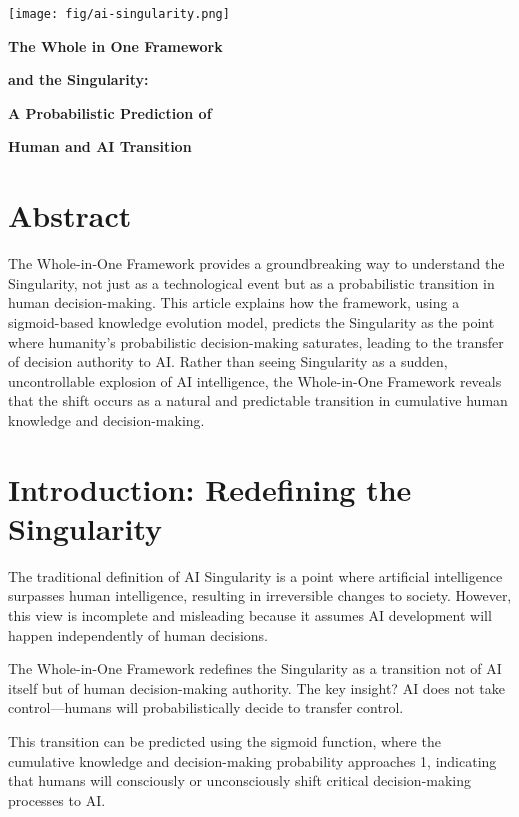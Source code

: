 \documentclass[a4]{article}
\newcommand{\bn}{\bigskip\noindent}
\newcommand{\mn}{\medskip\noindent}
\begin{document}
\begin{center}
\texttt{[image: fig/ai-singularity.png]}
\end{center}

\mn
{\huge\bf The Whole in One Framework}  

\bn
{\huge\bf  and the Singularity: }

\bn
{\huge\bf A Probabilistic Prediction of }

\bn
{\huge\bf Human and AI Transition}

\bn
\section*{Abstract}

The Whole-in-One Framework provides a groundbreaking way to understand the Singularity, not just as a technological event but as a probabilistic transition in human decision-making. This article explains how the framework, using a sigmoid-based knowledge evolution model, predicts the Singularity as the point where humanity's probabilistic decision-making saturates, leading to the transfer of decision authority to AI. Rather than seeing Singularity as a sudden, uncontrollable explosion of AI intelligence, the Whole-in-One Framework reveals that the shift occurs as a natural and predictable transition in cumulative human knowledge and decision-making.

\section{Introduction: Redefining the Singularity}  

The traditional definition of AI Singularity is a point where artificial intelligence surpasses human intelligence, resulting in irreversible changes to society. However, this view is incomplete and misleading because it assumes AI development will happen independently of human decisions.

\bn
The Whole-in-One Framework redefines the Singularity as a transition not of AI itself but of human decision-making authority. The key insight? AI does not take control---humans will probabilistically decide to transfer control.  

\bn
This transition can be predicted using the sigmoid function, where the cumulative knowledge and decision-making probability approaches 1, indicating that humans will consciously or unconsciously shift critical decision-making processes to AI.
\end{document}
